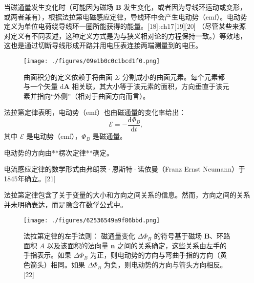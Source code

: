 当磁通量发生变化时（可能因为磁场 \( \mathbf{B} \) 发生变化，或者因为导线环运动或变形，或两者兼有），根据法拉第电磁感应定律，导线环中会产生电动势（emf）。电动势定义为单位电荷绕导线环一圈所能获得的能量。[18]: ch17 [19][20] （尽管某些来源对定义有不同表述，这种定义方式是为与狭义相对论的方程保持一致。）等效地，这也是通过切断导线形成开路并用电压表连接两端测量到的电压。
\begin{figure}[ht]
\centering
\texttt{[image: ./figures/09e1b0c0c1bcd1f0.png]}
\caption{曲面积分的定义依赖于将曲面 \( \Sigma \) 分割成小的曲面元素。每个元素都与一个矢量 \( \mathrm{d}\mathbf{A} \) 相关联，其大小等于该元素的面积，方向垂直于该元素并指向“外侧”（相对于曲面方向而言）。} \label{fig_FLDL_5}
\end{figure}
法拉第定律表明，电动势（emf）也由磁通量的变化率给出：
\[
\mathcal{E} = -\frac{\mathrm{d} \Phi_B}{\mathrm{d} t},~
\]
其中 \( \mathcal{E} \) 是电动势（emf），\( \Phi_B \) 是磁通量。

电动势的方向由**楞次定律**确定。

电流感应定律的数学形式由弗朗茨·恩斯特·诺依曼（Franz Ernst Neumann）于1845年确立。[21]  

法拉第定律包含了关于变量的大小和方向之间关系的信息。然而，方向之间的关系并未明确表达，而是隐含在数学公式中。
\begin{figure}[ht]
\centering
\texttt{[image: ./figures/62536549a9f86bbd.png]}
\caption{法拉第定律的左手法则：   磁通量变化 \( \Delta \Phi_B \) 的符号基于磁场 \( \mathbf{B} \)、环路面积 \( A \) 以及该面积的法向量 \( \mathbf{n} \) 之间的关系确定，这些关系由左手的手指表示。如果 \( \Delta \Phi_B \) 为正，则电动势的方向与弯曲手指的方向（黄色箭头）相同。如果 \( \Delta \Phi_B \) 为负，则电动势的方向与箭头方向相反。[22]} \label{fig_FLDL_6}
\end{figure}